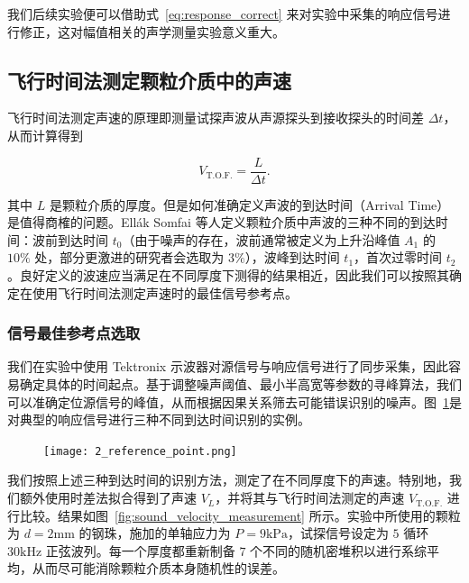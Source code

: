 我们后续实验便可以借助式~\eqref{eq:response_correct} 来对实验中采集的响应信号进行修正，这对幅值相关的声学测量实验意义重大。

\subsection{飞行时间法测定颗粒介质中的声速}

飞行时间法测定声速的原理即测量试探声波从声源探头到接收探头的时间差 $\Delta t$，从而计算得到

\begin{equation}
  V_{\text{T.O.F.}} = \frac{L}{\Delta t}.
\end{equation}

其中 $L$ 是颗粒介质的厚度。但是如何准确定义声波的到达时间（Arrival Time）是值得商榷的问题。Ellák Somfai 等人定义颗粒介质中声波的三种不同的到达时间：波前到达时间 $t_{0}$（由于噪声的存在，波前通常被定义为上升沿峰值 $A_{1}$ 的 $\num{10}\%$ 处，部分更激进的研究者会选取为 $3\%$），波峰到达时间 $t_{1}$，首次过零时间 $t_{2}$\cite{PhysRevE.72.021301}。良好定义的波速应当满足在不同厚度下测得的结果相近，因此我们可以按照其确定在使用飞行时间法测定声速时的最佳信号参考点。


\subsubsection{信号最佳参考点选取}

我们在实验中使用 Tektronix 示波器对源信号与响应信号进行了同步采集，因此容易确定具体的时间起点。基于调整噪声阈值、最小半高宽等参数的寻峰算法，我们可以准确定位源信号的峰值，从而根据因果关系筛去可能错误识别的噪声。图~\ref{fig:reference_point}是对典型的响应信号进行三种不同到达时间识别的实例。


\begin{figure}[!htp]
  \centering
  \texttt{[image: 2\_reference\_point.png]}
  \label{fig:reference_point}
\end{figure}

我们按照上述三种到达时间的识别方法，测定了在不同厚度下的声速。特别地，我们额外使用时差法拟合得到了声速 $V_{L}$，并将其与飞行时间法测定的声速 $V_{\text{T.O.F.}}$ 进行比较。结果如图~\ref{fig:sound_velocity_measurement} 所示。实验中所使用的颗粒为 $d=2\unit{\milli\meter}$ 的钢珠，施加的单轴应力为 $P=9\unit{\kilo\Pa}$，试探信号设定为 $5$ 循环 $30\unit{\kilo\Hz}$ 正弦波列。每一个厚度都重新制备 $7$ 个不同的随机密堆积以进行系综平均，从而尽可能消除颗粒介质本身随机性的误差。

